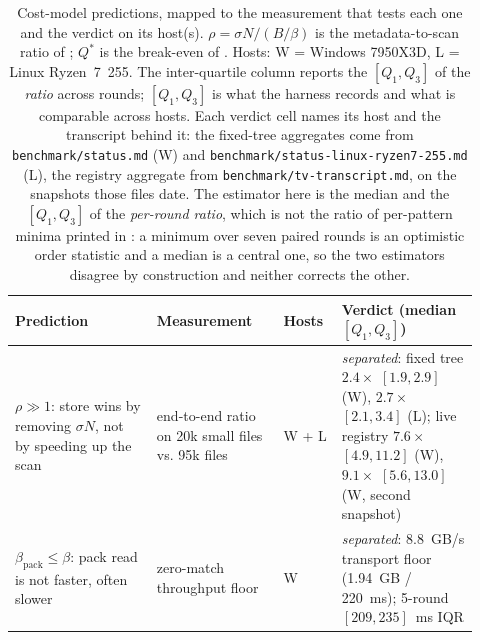 \documentclass[11pt,letterpaper]{article}
\begin{document}
\begin{table}[htbp]
\centering
\footnotesize
\caption{Cost-model predictions, mapped to the measurement that tests each
one and the verdict on its host(s). $\rho = \sigma N/(B/\beta)$ is the
metadata-to-scan ratio of ; $Q^{*}$ is the
break-even of . Hosts: W = Windows 7950X3D, L = Linux
Ryzen~7~255. The inter-quartile column reports the
$[Q_1,Q_3]$ of the \emph{ratio} across rounds; $[Q_1,Q_3]$ is what the
harness records and what is comparable across hosts. Each verdict cell names its
host and the transcript behind it: the fixed-tree aggregates come from
\texttt{benchmark/status.md} (W) and
\texttt{benchmark/status-linux-ryzen7-255.md} (L), the registry aggregate from
\texttt{benchmark/tv-transcript.md}, on the snapshots those files date. The
estimator here is the median and the $[Q_1,Q_3]$ of the \emph{per-round ratio},
which is not the ratio of per-pattern minima printed in
: a minimum over seven paired rounds is an
optimistic order statistic and a median is a central one, so the two estimators
disagree by construction and neither corrects the other.}
\label{tab:predictions}
\setlength{\tabcolsep}{3pt}
\begin{tabular}{@{}>{\raggedright\arraybackslash}p{0.29\linewidth}>{\raggedright\arraybackslash}p{0.25\linewidth}>{\raggedright\arraybackslash}p{0.11\linewidth}>{\raggedright\arraybackslash}p{0.27\linewidth}@{}}
\toprule
\textbf{Prediction} & \textbf{Measurement} & \textbf{Hosts} & \textbf{Verdict (median $[Q_1,Q_3]$)} \\
\midrule
$\rho \gg 1$: store wins by removing $\sigma N$, not by speeding up the scan
  & end-to-end ratio on 20k small files vs. 95k files
  & W + L
  & \emph{separated}: fixed tree $2.4\times$ $[1.9,2.9]$ (W), $2.7\times$ $[2.1,3.4]$ (L); live registry $7.6\times$ $[4.9,11.2]$ (W), $9.1\times$ $[5.6,13.0]$ (W, second snapshot) \\
$\beta_{\text{pack}} \le \beta$: pack read is not faster, often slower
  & zero-match throughput floor
  & W
  & \emph{separated}: $8.8$~GB/s transport floor (1.94~GB / 220~ms); 5-round $[209,235]$~ms IQR \\

\end{tabular}
\end{table}
\end{document}
